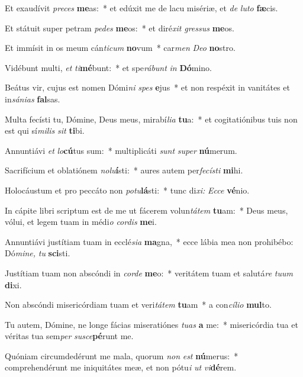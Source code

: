 \item Et exaudívit \textit{preces} \textbf{me}as:~* et edúxit me de lacu misériæ, et \textit{de} \textit{luto} \textbf{fæ}cis.
\item Et státuit super petram \textit{pedes} \textbf{me}os:~* et diré\textit{xit} \textit{gressus} \textbf{me}os.
\item Et immísit in os meum cán\textit{ticum} \textbf{no}vum~* car\textit{men} \textit{Deo} \textbf{no}stro.
\item Vidébunt multi, \textit{et} \textit{ti}\textbf{mé}bunt:~* et spe\textit{rábunt} \textit{in} \textbf{Dó}mino.
\item Beátus vir, cujus est nomen Dómi\textit{ni} \textit{spes} \textbf{e}jus~* et non respéxit in vanitátes et in\textit{sánias} \textbf{fal}sas.
\item Multa fecísti tu, Dómine, Deus meus, mirabí\textit{lia} \textbf{tu}a:~* et cogitatiónibus tuis non est qui sí\textit{milis} \textit{sit} \textbf{ti}bi.
\item Annuntiávi \textit{et} \textit{lo}\textbf{cú}tus sum:~* multiplicáti \textit{sunt} \textit{super} \textbf{nú}merum.
\item Sacrifícium et oblatiónem \textit{nolu}\textbf{í}sti:~* aures autem per\textit{fecísti} \textbf{mi}hi.
\item Holocáustum et pro peccáto non \textit{potu}\textbf{lá}sti:~* tunc di\textit{xi:} \textit{Ecce} \textbf{vé}nio.
\item In cápite libri scriptum est de me ut fácerem volun\hspace{0.01em}\textit{tátem} \textbf{tu}am:~* Deus meus, vólui, et legem tuam in médi\textit{o} \textit{cordis} \textbf{me}i.
\item Annuntiávi justítiam tuam in ecclé\textit{sia} \textbf{ma}gna,~* ecce lábia mea non prohibébo: Dó\textit{mine,} \textit{tu} \textbf{sci}sti.
\item Justítiam tuam non abscóndi in \textit{corde} \textbf{me}o:~* veritátem tuam et salutá\textit{re} \textit{tuum} \textbf{di}xi.
\item Non abscóndi misericórdiam tuam et veri\textit{tátem} \textbf{tu}am~* a con\textit{cílio} \textbf{mul}to.
\item Tu autem, Dómine, ne longe fácias miseratiónes \textit{tuas} \textbf{a} me:~* misericórdia tua et véritas tua sem\textit{per} \textit{susce}\textbf{pé}runt me.
\item Quóniam circumdedérunt me mala, quorum \textit{non} \textit{est} \textbf{nú}merus:~* comprehendérunt me iniquitátes meæ, et non pótu\textit{i} \textit{ut} \textit{vi}\textbf{dé}rem.
